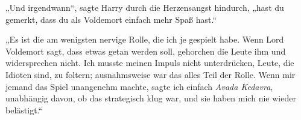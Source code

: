 „Und irgendwann“, sagte Harry durch die Herzensangst hindurch, „hast du gemerkt, dass du als Voldemort einfach mehr Spaß hast.“

„Es ist die am wenigsten nervige Rolle, die ich je gespielt habe. Wenn Lord Voldemort sagt, dass etwas getan werden soll, gehorchen die Leute ihm und widersprechen nicht. Ich musste meinen Impuls nicht unterdrücken, Leute, die Idioten sind, zu foltern; ausnahmsweise war das alles Teil der Rolle. Wenn mir jemand das Spiel unangenehm machte, sagte ich einfach \emph{Avada Kedavra}, unabhängig davon, ob das strategisch klug war, und sie haben mich nie wieder belästigt.“
